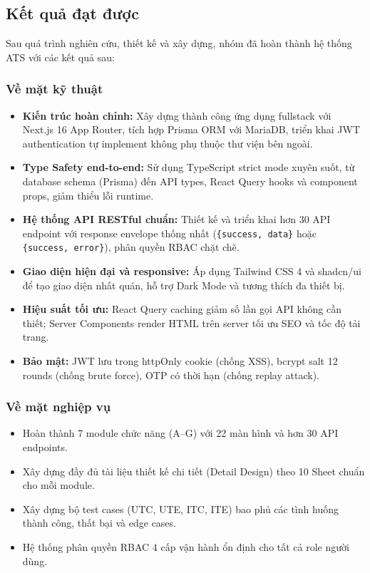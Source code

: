 \subsection{Kết quả đạt được}
Sau quá trình nghiên cứu, thiết kế và xây dựng, nhóm đã hoàn thành hệ thống ATS với các kết quả sau:

\subsubsection*{Về mặt kỹ thuật}
\begin{itemize}
    \item \textbf{Kiến trúc hoàn chỉnh:} Xây dựng thành công ứng dụng fullstack với Next.js 16 App Router, tích hợp Prisma ORM với MariaDB, triển khai JWT authentication tự implement không phụ thuộc thư viện bên ngoài.
    \item \textbf{Type Safety end-to-end:} Sử dụng TypeScript strict mode xuyên suốt, từ database schema (Prisma) đến API types, React Query hooks và component props, giảm thiểu lỗi runtime.
    \item \textbf{Hệ thống API RESTful chuẩn:} Thiết kế và triển khai hơn 30 API endpoint với response envelope thống nhất (\texttt{\{success, data\}} hoặc \texttt{\{success, error\}}), phân quyền RBAC chặt chẽ.
    \item \textbf{Giao diện hiện đại và responsive:} Áp dụng Tailwind CSS 4 và shadcn/ui để tạo giao diện nhất quán, hỗ trợ Dark Mode và tương thích đa thiết bị.
    \item \textbf{Hiệu suất tối ưu:} React Query caching giảm số lần gọi API không cần thiết; Server Components render HTML trên server tối ưu SEO và tốc độ tải trang.
    \item \textbf{Bảo mật:} JWT lưu trong httpOnly cookie (chống XSS), bcrypt salt 12 rounds (chống brute force), OTP có thời hạn (chống replay attack).
\end{itemize}

\subsubsection*{Về mặt nghiệp vụ}
\begin{itemize}
    \item Hoàn thành 7 module chức năng (A--G) với 22 màn hình và hơn 30 API endpoints.
    \item Xây dựng đầy đủ tài liệu thiết kế chi tiết (Detail Design) theo 10 Sheet chuẩn cho mỗi module.
    \item Xây dựng bộ test cases (UTC, UTE, ITC, ITE) bao phủ các tình huống thành công, thất bại và edge cases.
    \item Hệ thống phân quyền RBAC 4 cấp vận hành ổn định cho tất cả role người dùng.
\end{itemize}

